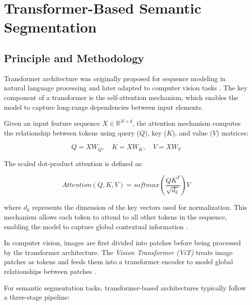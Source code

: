 \section{Transformer-Based Semantic Segmentation}

\subsection{Principle and Methodology}

Transformer architecture was originally proposed for sequence modeling in natural language processing and later adapted to computer vision tasks \cite{vaswani2017attention}. 
The key component of a transformer is the self-attention mechanism, which enables the model to capture long-range dependencies between input elements.

Given an input feature sequence $X \in \mathbb{R}^{N \times d}$, the attention mechanism computes the relationship between tokens using query ($Q$), key ($K$), and value ($V$) matrices:

\begin{equation}
Q = XW_Q,\quad K = XW_K,\quad V = XW_V
\end{equation}

The scaled dot-product attention is defined as:

\begin{equation}
Attention(Q,K,V) = softmax\left(\frac{QK^T}{\sqrt{d_k}}\right)V
\end{equation}

where $d_k$ represents the dimension of the key vectors used for normalization. 
This mechanism allows each token to attend to all other tokens in the sequence, enabling the model to capture global contextual information \cite{vaswani2017attention}.

In computer vision, images are first divided into patches before being processed by the transformer architecture. 
The \textit{Vision Transformer (ViT)} treats image patches as tokens and feeds them into a transformer encoder to model global relationships between patches \cite{dosovitskiy2020image}.

For semantic segmentation tasks, transformer-based architectures typically follow a three-stage pipeline:

